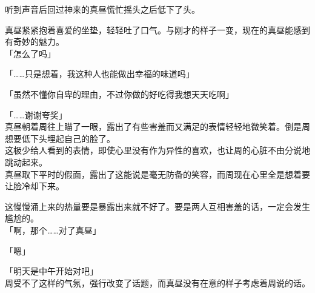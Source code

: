 听到声音后回过神来的真昼慌忙摇头之后低下了头。

真昼紧紧抱着喜爱的坐垫，轻轻吐了口气。与刚才的样子一变，现在的真昼能感到有奇妙的魅力。\\

「怎么了吗」

「……只是想着，我这种人也能做出幸福的味道吗」

「虽然不懂你自卑的理由，不过你做的好吃得我想天天吃啊」

「……谢谢夸奖」\\

真昼朝着周往上瞄了一眼，露出了有些害羞而又满足的表情轻轻地微笑着。倒是周想要低下头埋起自己的脸了。\\

这极少给人看到的表情，即使心里没有作为异性的喜欢，也让周的心脏不由分说地跳动起来。\\

真昼取下平时的假面，露出了这能说是毫无防备的笑容，而周现在心里全是想着要让脸冷却下来。

这慢慢涌上来的热量要是暴露出来就不好了。要是两人互相害羞的话，一定会发生尴尬的。\\

「啊，那个……对了真昼」

「嗯」

「明天是中午开始对吧」\\

周受不了这样的气氛，强行改变了话题，而真昼没有在意的样子考虑着周说的话。\\

